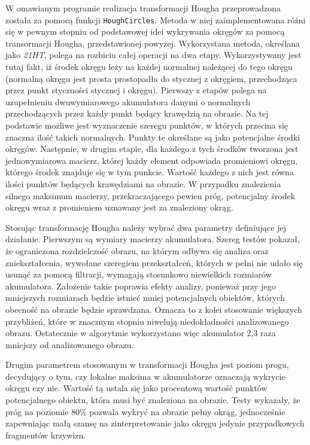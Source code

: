 W omawianym programie realizacja transformacji Hougha przeprowadzona została za pomocą funkcji \texttt{HoughCircles}. Metoda w niej zaimplementowana różni się w pewnym stopniu od podstawowej idei wykrywania okręgów za pomocą transormacji Hougha, przedstawionej powyżej. Wykorzystana metoda, określana jako \textit{21HT}, polega na rozbiciu całej operacji na dwa etapy. Wykorzystywany jest tutaj fakt, iż środek okręgu leży na każdej normalnej należącej do tego okręgu (normalną okręgu jest prosta prostopadła do stycznej z okręgiem, przechodząca przez punkt styczności stycznej i okręgu). Pierwszy z etapów polega na uzupełnieniu dwuwymiarowego akumulatora danymi o normalnych przechodzących przez każdy punkt będący krawędzią na obrazie. Na tej podstawie możliwe jest wyznaczenie szeregu punktów, w których przecina się znaczna ilość takich normalnych. Punkty te określane są jako potencjalne środki okręgów. Następnie, w drugim etapie, dla każdego z tych środków tworzona jest jednowymiarowa macierz, której każdy element odpowiada promieniowi okręgu, którego środek znajduje się w tym punkcie. Wartość każdego z nich jest równa ilości punktów będących krawędziami na obrazie. W przypadku znalezienia silnego maksimum macierzy, przekraczającego pewien próg, potencjalny środek okręgu wraz z promieniem uznawany jest za znaleziony okrąg\cite{Yuen}.

Stosując transformację Hougha należy wybrać dwa parametry definiujące jej działanie. Pierwszym są wymiary macierzy akumulatora. Szereg testów pokazał, że ograniczona rozdzielczość obrazu, na którym odbywa się analiza oraz zniekształcenia, wywołane szeregiem przekształceń, których w pełni nie udało się usunąć za pomocą filtracji, wymagają stosunkowo niewielkich rozmiarów akumulatora. Założenie takie poprawia efekty analizy, ponieważ przy jego mniejszych rozmiarach będzie istnieć mniej potencjalnych obiektów, których obecność na obrazie będzie sprawdzana. Oznacza to z kolei stosowanie większych przybliżeń, które w znacznym stopniu niwelują niedokładności analizowanego obrazu. Ostatecznie w algorytmie wykorzystano więc akumulator 2,3 raza mniejszy od analizowanego obrazu.

Drugim parametrem stosowanym w transformacji Hougha jest poziom progu, decydujący o tym, czy lokalne maksima w akumulatorze oznaczają wykrycie okręgu czy nie. Wartość tą ustala się jako procentową wartość punktów potencjalnego obiektu, która musi być znaleziona na obrazie. Testy wykazały, że próg na poziomie 80\% pozwala wykryć na obrazie pełny okrąg, jednocześnie zapewniając małą szansę na zinterpretowanie jako okręgu jedynie przypadkowych fragmentów krzywizn.

